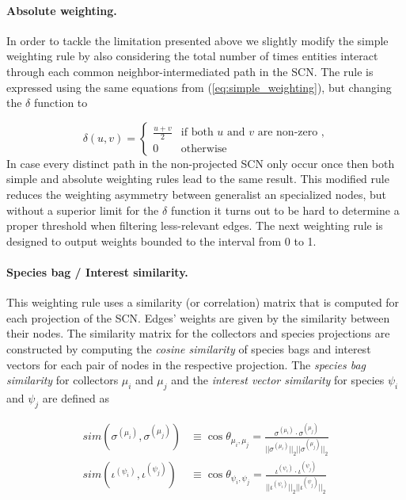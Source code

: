 \paragraph*{Absolute weighting.}
In order to tackle the limitation presented above we slightly modify the simple weighting rule by also considering the total number of times entities interact through each common neighbor-intermediated path in the SCN. The rule is expressed using the same equations from (\ref{eq:simple_weighting}), but changing the $\delta$ function to
 
$$\delta(u,v) = 
\begin{cases}
\frac{u+v}{2} &  \mbox{if both } u \mbox{ and } v \mbox{ are non-zero ,}\\
0 & \mbox{otherwise}
\end{cases}
$$
In case every distinct path in the non-projected SCN only occur once then both simple and absolute weighting rules lead to the same result. This modified rule reduces the weighting asymmetry between generalist an specialized nodes,  but without a superior limit for the $\delta$ function it turns out to be hard to determine a proper threshold when filtering less-relevant edges. The next weighting rule is designed to output weights bounded to the interval from 0 to 1.

\paragraph*{Species bag / Interest similarity.}
This weighting rule uses a similarity (or correlation) matrix that is computed for each projection of the SCN. Edges' weights are given by the similarity between their nodes. The similarity matrix for the collectors and species projections are constructed by computing the  \textit{cosine similarity} of species bags and interest vectors  for each pair of nodes in the respective projection. 
The \textit{species bag similarity} for collectors $\mu_i$ and $\mu_j$ and the \textit{interest vector similarity} for species $\psi_i$ and $\psi_j$ are defined as

\begin{equation}
\begin{split}
sim(\sigma^{(\mu_i)},\sigma^{(\mu_j)}) &\equiv
\cos \theta_{\mu_i,\mu_j} =
\frac{  \sigma^{(\mu_i)} \cdot \sigma^{(\mu_j)}  }{  ||\sigma^{(\mu_i)}||_2  ||\sigma^{(\mu_j)}||_2  } \\
sim(\iota^{(\psi_i)},\iota^{(\psi_j)}) &\equiv
\cos \theta_{\psi_i,\psi_j} =
\frac{  \iota^{(\psi_i)} \cdot \iota^{(\psi_j)}  }{  ||\iota^{(\psi_i)}||_2  ||\iota^{(\psi_j)}||_2  } 
\end{split}
\end{equation}

